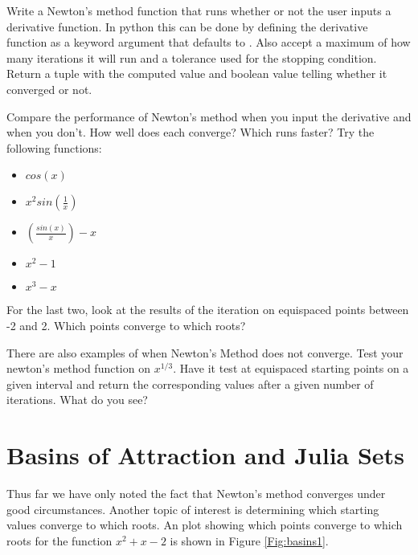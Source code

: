 \begin{problem}
\label{prob:newton_arr}
Write a Newton's method function that runs whether or not the user inputs a derivative function.
In python this can be done by defining the derivative function as a keyword argument that defaults to .
Also accept a maximum of how many iterations it will run and a tolerance used for the stopping condition.
Return a tuple with the computed value and boolean value telling whether it converged or not.

Compare the performance of Newton's method when you input the derivative and when you don't.
How well does each converge?
Which runs faster?
Try the following functions:

\begin{itemize}
\item $cos(x)$
\item $x^2sin(\frac{1}{x})$
\item $(\frac{sin(x)}{x})-x$
\item $x^2-1$
\item $x^3 - x$
\end{itemize}

For the last two, look at the results of the iteration on equispaced points between -2 and 2.
Which points converge to which roots?

There are also examples of when Newton's Method does not converge.
Test your newton's method function on $x^{1/3}$.
Have it test at equispaced starting points on a given interval and return the corresponding values after a given number of iterations.
What do you see?
\end{problem}

\begin{comment}
\begin{problem}
Extend your Newton's method even further so that it will work on systems of equations.
Suppose that $F: \mathbb{R}^n \rightarrow \mathbb{R}^n $.
The relevant equation is
\[
x_{i+1} = x_i - J^{-1}F(x_i)
\]
Note that you should not calculate the inverse Jacobian.
\li{scipy.linalg.solve(A,b)} gives you the solution $x$ to the equation $Ax=b$.
Use this fact to calculate $J^{-1}F$ from $J$ and $F$.
You should be able to make this function work whether or not the user inputs a Jacobian.
This also means that you will have to use your own \li{jacobian} function.
\end{problem}
\end{comment}

\section*{Basins of Attraction and Julia Sets}
Thus far we have only noted the fact that Newton's method converges under good circumstances.
Another topic of interest is determining which starting values converge to which roots.
An plot showing which points converge to which roots for the function $x^2 + x - 2$ is shown in Figure \ref{Fig:basins1}.

